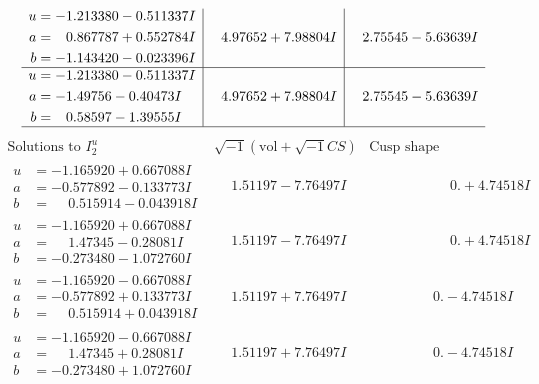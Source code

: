 \documentclass[1p]{elsarticle_modified}
\theoremstyle{definition}
\newcommand{\I}{\sqrt{-1}}
\begin{document}
$$\begin{array}{c|c|c}
\begin{aligned}
u &= -1.213380 - 0.511337 I \\
a &= \phantom{-}0.867787 + 0.552784 I \\
b &= -1.143420 - 0.023396 I\end{aligned}
 & \phantom{-}4.97652 + 7.98804 I & \phantom{-}2.75545 - 5.63639 I \\ \hline\begin{aligned}
u &= -1.213380 - 0.511337 I \\
a &= -1.49756 - 0.40473 I \\
b &= \phantom{-}0.58597 - 1.39555 I\end{aligned}
 & \phantom{-}4.97652 + 7.98804 I & \phantom{-}2.75545 - 5.63639 I\\
 \hline 
 \end{array}$$\newpage$$\begin{array}{c|c|c}  
\text{Solutions to }I^u_{2}& \I (\text{vol} + \sqrt{-1}CS) & \text{Cusp shape}\\
 \hline 
\begin{aligned}
u &= -1.165920 + 0.667088 I \\
a &= -0.577892 - 0.133773 I \\
b &= \phantom{-}0.515914 - 0.043918 I\end{aligned}
 & \phantom{-}1.51197 - 7.76497 I & \phantom{-0.000000 -}0. + 4.74518 I \\ \hline\begin{aligned}
u &= -1.165920 + 0.667088 I \\
a &= \phantom{-}1.47345 - 0.28081 I \\
b &= -0.273480 - 1.072760 I\end{aligned}
 & \phantom{-}1.51197 - 7.76497 I & \phantom{-0.000000 -}0. + 4.74518 I \\ \hline\begin{aligned}
u &= -1.165920 - 0.667088 I \\
a &= -0.577892 + 0.133773 I \\
b &= \phantom{-}0.515914 + 0.043918 I\end{aligned}
 & \phantom{-}1.51197 + 7.76497 I & \phantom{-0.000000 } 0. - 4.74518 I \\ \hline\begin{aligned}
u &= -1.165920 - 0.667088 I \\
a &= \phantom{-}1.47345 + 0.28081 I \\
b &= -0.273480 + 1.072760 I\end{aligned}
 & \phantom{-}1.51197 + 7.76497 I & \phantom{-0.000000 } 0. - 4.74518 I \\ \hline\begin{aligned}

\end{aligned}
\end{array}$$
\end{document}
